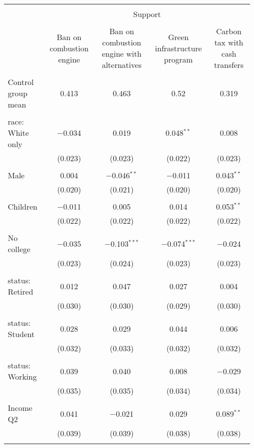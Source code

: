 
\begin{tabular}{@{\extracolsep{5pt}}lcccc} 
\\[-1.8ex]\hline 
\hline \\[-1.8ex] 
 & \multicolumn{4}{c}{Support} \\ 
\cline{2-5} 
\\[-1.8ex] & Ban on combustion engine & Ban on combustion engine with alternatives & Green infrastructure program & Carbon tax with cash transfers \\ 
\hline \\[-1.8ex] 
 Control group mean & 0.413 & 0.463 & 0.52 & 0.319  \\ \hline \\[-1.8ex] race: White only & $-$0.034 & 0.019 & 0.048$^{**}$ & 0.008 \\ 
  & (0.023) & (0.023) & (0.022) & (0.023) \\ 
  & & & & \\ 
 Male & 0.004 & $-$0.046$^{**}$ & $-$0.011 & 0.043$^{**}$ \\ 
  & (0.020) & (0.021) & (0.020) & (0.020) \\ 
  & & & & \\ 
 Children & $-$0.011 & 0.005 & 0.014 & 0.053$^{**}$ \\ 
  & (0.022) & (0.022) & (0.022) & (0.022) \\ 
  & & & & \\ 
 No college & $-$0.035 & $-$0.103$^{***}$ & $-$0.074$^{***}$ & $-$0.024 \\ 
  & (0.023) & (0.024) & (0.023) & (0.023) \\ 
  & & & & \\ 
 status: Retired & 0.012 & 0.047 & 0.027 & 0.004 \\ 
  & (0.030) & (0.030) & (0.029) & (0.030) \\ 
  & & & & \\ 
 status: Student & 0.028 & 0.029 & 0.044 & 0.006 \\ 
  & (0.032) & (0.033) & (0.032) & (0.032) \\ 
  & & & & \\ 
 status: Working & 0.039 & 0.040 & 0.008 & $-$0.029 \\ 
  & (0.035) & (0.035) & (0.034) & (0.034) \\ 
  & & & & \\ 
 Income Q2 & 0.041 & $-$0.021 & 0.029 & 0.089$^{**}$ \\ 
  & (0.039) & (0.039) & (0.038) & (0.038) \\ 
  & & & & \\ 

\end{tabular}
